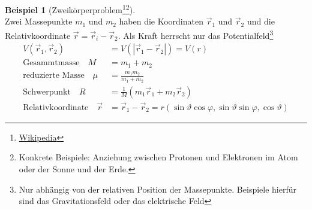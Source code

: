 \documentclass[oneside]{book}
\theoremstyle{definition}
\newtheorem*{beispiel*}{Beispiel}
\begin{document}
\begin{beispiel*}[Zweikörperproblem\footnote{\href{http://de.wikipedia.org/wiki/Zweik\%C3\%B6rperproblem}{Wikipedia}}\footnote{Konkrete Beispiele: Anziehung zwischen Protonen und Elektronen im Atom oder der Sonne und der Erde.}]~\\
Zwei Massepunkte $m_1$ und $m_2$ haben die Koordinaten $\vec{r}_1$ und $\vec{r}_2$ und die Relativkoordinate $\vec{r} = \vec{r}_i - \vec{r}_2$. Als Kraft herrscht nur das Potentialfeld\footnote{Nur abhängig von der relativen Position der Massepunkte. Beispiele hierfür sind das Gravitationsfeld oder das elektrische Feld}
\begin{align*}
V(\vec{r}_1, \vec{r}_2) &= V(| \vec{r}_1 - \vec{r}_2|) = V(r)\\
\text{Gesammtmasse~~~} M &= m_1 + m_2\\
\text{reduzierte Masse~~~} \mu &= \frac{m_1 m_2}{m_1 + m_2}\\
\text{Schwerpunkt~~~} R &= \frac{1}{M} (m_1 \vec{r}_1 + m_2 \vec{r}_2)\\
\text{Relativkoordinate~~~} \vec{r} &= \vec{r}_1 - \vec{r}_2 = r (\sin \vartheta \cos \varphi, \sin \vartheta \sin \varphi, \cos \vartheta)
\end{align*}


\end{beispiel*}
\end{document}
